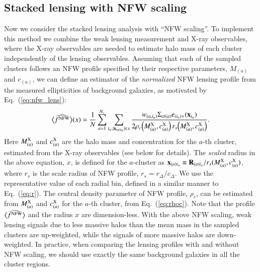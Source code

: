 \documentclass[iop, apj]{emulateapj}
\def\ave#1{\left\langle #1 \right\rangle}
\newcommand{\?}{\stackrel{?}{=}}
\begin{document}
\subsection{Stacked lensing with NFW scaling}
\label{sec:stacked_nfw}

Now we consider the stacked lensing analysis with ``NFW scaling''.  To
implement this method we combine the weak lensing measurement and X-ray
observables, where the X-ray observables are needed to estimate halo
mass of each cluster independently of the lensing observables.  Assuming
that each of the sampled clusters follows an NFW profile specified by
their respective parameters, $M_{(a)}$ and $c_{(a)}$, we can define an
estimator of the {\it normalized} NFW lensing profile from the measured
ellipticities of background galaxies, as motivated by
Eq.~(\ref{eq:nfw_lens}):
%
\begin{equation}
    \widehat{\ave{f^{\rm NFW}}}(x)=
    \frac{1}{N}\sum_{a=1}^{N_c}\sum_{i_a; |{\bf x}_{(a)i_a}|\in x}
    \frac{    w_{(a, i_a)}\Sigma_{{\rm cr}(a)}
    e_{(i_a)+}({\bf x}_{i_a})}{2\rho_{c}\!\left(M^{\rm X}_{(a)},c^{\rm
    X}_{(a)}\right)r_s\!\left(M^{\rm X}_{(a)},c^{\rm X}_{(a)}\right)}.
    \label{eq:est_fnfw}
\end{equation}
%
Here $M^{\rm X}_{(a)}$ and $c^{\rm X}_{(a)}$ are the halo mass and
concentration for the $a$-th cluster, estimated from the X-ray
observables (see below for details).  The {\it scaled} radius in the
above equation, $x$, is defined for the $a$-cluster as ${\bf
x}_{(a)i_a}\equiv {\bf R}_{(a)i_a}/r_{s}(M^{\rm X}_{(a)},c^{\rm
X}_{(a)})$, where $r_s$ is the scale radius of NFW profile,
$r_{s}=r_\Delta/c_\Delta$.  We use the representative value of each
radial bin, defined in a similar manner to Eq.~(\ref{eq:r}).  The
central density parameter of NFW profile, $\rho_c$, can be estimated
from $M^{\rm X}_{(a)}$ and $c^{\rm X}_{(a)}$ for the $a$-th cluster,
from Eq.~(\ref{eq:rhoc}).  Note that the profile $\widehat{\ave{f^{\rm
NFW}}}$ and the radius $x$ are dimension-less. With the above NFW
scaling, weak lensing signals due to less massive halos than the mean
mass in the sampled clusters are up-weighted, while the signals of more
massive halos are down-weighted. In practice, when comparing the lensing
profiles with and without NFW scaling, we should use exactly the same
background galaxies in all the cluster regions.
\end{document}
